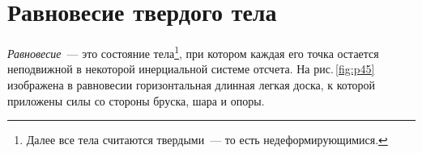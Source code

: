 \documentclass[main.tex]{subfiles}
\begin{document}



 

 

 
   

\section{Равновесие твердого тела}

\emph{Равновесие}~--- это состояние тела\footnote{Далее все тела считаются твердыми~--- то есть недеформирующимися.}, при котором каждая его точка остается неподвижной в некоторой инерциальной системе отсчета. На рис.\,\ref{fig:p45} изображена в равновесии горизонтальная длинная легкая доска, к которой приложены силы со стороны бруска, шара и опоры. 
\end{document}
